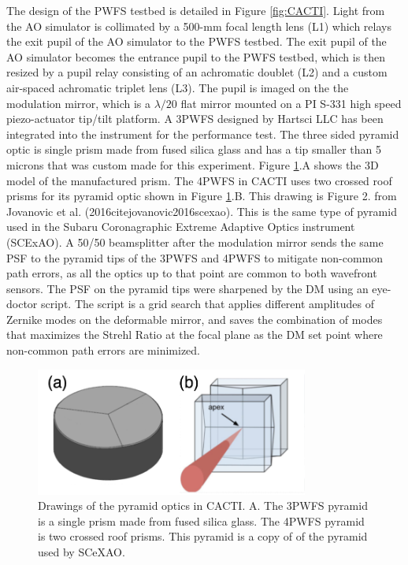 \documentclass[12pt]{spieman}  %
\begin{document}
\begin{spacing}{2}
The design of the PWFS testbed is detailed in Figure \ref{fig:CACTI}. Light from the AO simulator is collimated by a 500-mm focal length lens (L1) which relays the exit pupil of the AO simulator to the PWFS testbed. The exit pupil of the AO simulator becomes the entrance pupil to the PWFS testbed, which is then resized by a pupil relay consisting of an achromatic doublet (L2) and a custom air-spaced achromatic triplet lens (L3). The pupil is imaged on the the modulation mirror, which is a $\lambda/20$ flat mirror mounted on a PI S-331 high speed piezo-actuator tip/tilt platform. A 3PWFS designed by Hartsci LLC has been integrated into the instrument for the performance test. The three sided pyramid optic is single prism made from fused silica glass and has a tip smaller than 5 microns that was custom made for this experiment. Figure \ref{fig:pyramidOptics}.A shows the 3D model of the manufactured prism. The 4PWFS in CACTI uses two crossed roof prisms for its pyramid optic shown in Figure \ref{fig:pyramidOptics}.B. This drawing is Figure 2. from Jovanovic et al. (2016cite{jovanovic2016scexao}). This is the same type of pyramid used in the Subaru Coronagraphic Extreme Adaptive Optics instrument (SCExAO)\cite{jovanovic2015subaru}.  A 50/50 beamsplitter after the modulation mirror sends the same PSF to the pyramid tips of the 3PWFS and 4PWFS to mitigate non-common path errors, as all the optics up to that point are common to both wavefront sensors. The PSF on the pyramid tips were sharpened by the DM using an eye-doctor script. The script is a grid search that applies different amplitudes of Zernike modes on the deformable mirror, and saves the combination of modes that maximizes the Strehl Ratio at the focal plane as the  DM set point where non-common path errors are minimized.

\begin{figure}
    \centering
    \includegraphics[width=0.8\textwidth]{pyramidOptics.png}
    \caption{Drawings of the pyramid optics in CACTI. A. The 3PWFS pyramid is a single prism made from fused silica glass. The 4PWFS pyramid is two crossed roof prisms. This pyramid is a copy of of the pyramid used by SCeXAO. }
    \label{fig:pyramidOptics}
\end{figure}



\end{spacing}
\end{document}
